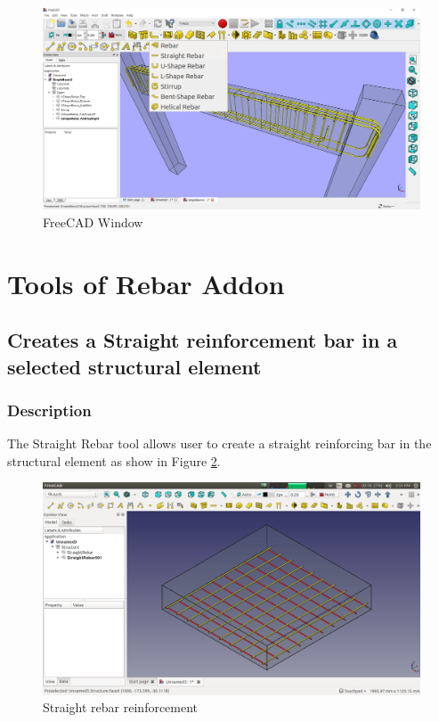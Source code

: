 \begin{figure}
    \centering \includegraphics[width=\linewidth]{images/r9b5l7K.jpg}
    \caption{FreeCAD Window}
    \label{mainFreeCADwindow}
\end{figure}

\section{Tools of Rebar Addon}
\subsection{Creates a Straight reinforcement bar in a selected structural element}

\subsubsection{Description}
The Straight Rebar tool allows user to create a straight reinforcing bar in the structural element as show in Figure \ref{straightrebar}.

\begin{figure}
    \centering \includegraphics[scale=0.35]{images/StraightRebar.png}
    \caption{Straight rebar reinforcement}
    \label{straightrebar}
\end{figure}

